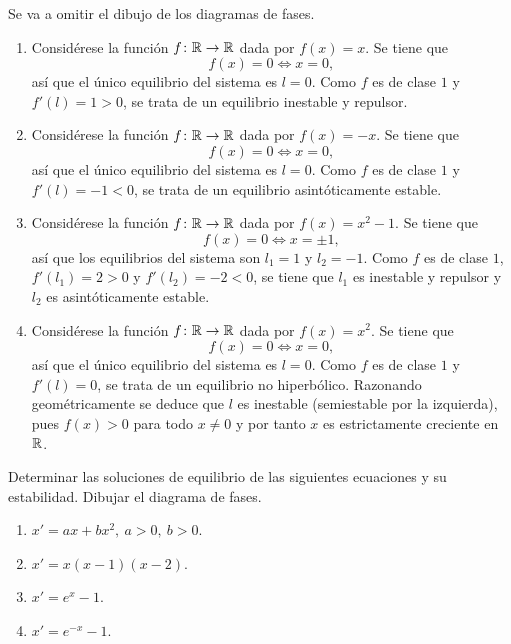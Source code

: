 \documentclass[11pt]{report}
\begin{document}
\begin{solution}
    Se va a omitir el dibujo de los diagramas de fases.
    \begin{enumerate}
        \item Considérese la función $f \colon \mathbb R \to \mathbb R$ dada por $f(x) = x$. Se tiene que
        \[f(x) = 0 \iff x = 0,\]
        así que el único equilibrio del sistema es $l = 0$. Como $f$ es de clase $1$ y $f'(l) = 1 > 0$, se trata de un equilibrio inestable y repulsor.
        \item Considérese la función $f \colon \mathbb R \to \mathbb R$ dada por $f(x) = -x$. Se tiene que
        \[f(x) = 0 \iff x = 0,\]
        así que el único equilibrio del sistema es $l = 0$. Como $f$ es de clase $1$ y $f'(l) = -1 < 0$, se trata de un equilibrio asintóticamente estable.
        \item Considérese la función $f \colon \mathbb R \to \mathbb R$ dada por $f(x) = x^2-1$. Se tiene que
        \[f(x) = 0 \iff x = \pm 1,\]
        así que los equilibrios del sistema son $l_1 = 1$ y $l_2 = -1$. Como $f$ es de clase $1$, $f'(l_1) = 2 > 0$ y $f'(l_2) = -2 < 0$, se tiene que $l_1$ es inestable y repulsor y $l_2$ es asintóticamente estable.
        \item Considérese la función $f \colon \mathbb R \to \mathbb R$ dada por $f(x) = x^2$. Se tiene que
        \[f(x) = 0 \iff x = 0,\]
        así que el único equilibrio del sistema es $l = 0$. Como $f$ es de clase $1$ y $f'(l) = 0$, se trata de un equilibrio no hiperbólico. Razonando geométricamente se deduce que $l$ es inestable (semiestable por la izquierda), pues $f(x) > 0$ para todo $x \neq 0$ y por tanto $x$ es estrictamente creciente en $\mathbb R$.
    \end{enumerate}
\end{solution}

\begin{exercise}
    Determinar las soluciones de equilibrio de las siguientes ecuaciones y su estabilidad. Dibujar el diagrama de fases.
    \begin{enumerate}
        \item $x' = ax+bx^2, \ a > 0, \ b > 0$.
        \item $x' = x(x-1)(x-2)$.
        \item $x' = e^x-1$.
        \item $x' = e^{-x}-1$.
    \end{enumerate}
\end{exercise}
\end{document}
